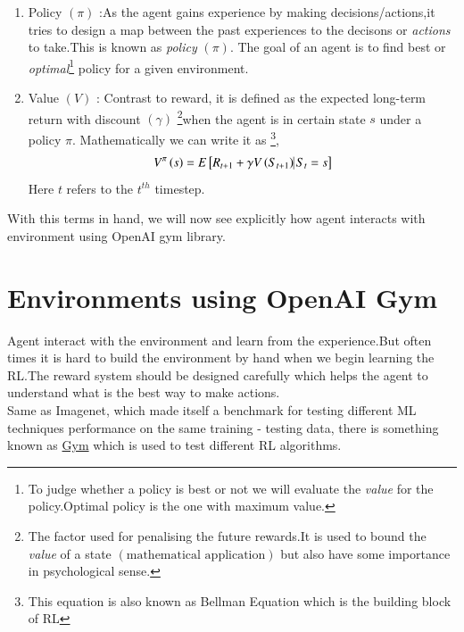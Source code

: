 \documentclass[journal,12pt,onecolumn]{IEEEtran}
\providecommand{\sbrak}[1]{\ensuremath{{}\left[#1\right]}}
\providecommand{\brak}[1]{\ensuremath{\left(#1\right)}}
\theoremstyle{remark}
\numberwithin{equation}{section}
\begin{document}
\begin{enumerate}
\begin{enumerate}
	     \item Policy $\brak{\pi}$ :As the agent gains experience by making decisions/actions,it tries to design a map between the past experiences to the decisons or \textit{actions} to take.This is known as \textit{policy} $\brak{\pi}$. The goal of an agent is to find best or \textit{optimal}\footnote{To judge whether a policy is best or not we will evaluate the \emph{value} for the policy.Optimal policy is the one with maximum value.} policy for a given environment.
	     \item Value $\brak{V}$ : Contrast to reward, it is defined as the expected long-term return with discount $\brak{\gamma}$ \footnote{The factor used for penalising the future rewards.It is used to bound the \textit{value} of a state $\brak{\text{mathematical application}}$ but also have some importance in psychological sense.}when the agent is in certain state $s$ under a policy $\pi$. Mathematically we can write it as \footnote{This equation is also known as Bellman Equation which is the building block of RL},
		      \begin{align}
			      V^{\pi}\brak{s} = E\sbrak{R_{t+1} + \gamma V\brak{S_{t+1}} \vline S_{t} = s}
		      \end{align}
		      Here $t$ refers to the $t^{th}$ timestep.
	  \end{enumerate}
	\end{enumerate}
     With this terms in hand, we will now see explicitly how agent interacts with environment using OpenAI gym library.       
     \section{Environments using OpenAI Gym}
     Agent interact with the environment and learn from the experience.But often times it is hard to build the environment by hand when we begin learning the RL.The
     reward system should be designed carefully which helps the agent to understand what is the best way to make actions. \\ 
     Same as Imagenet, which made itself a benchmark for testing different ML techniques performance on the same training - testing data, there is something known as
     \href{https://www.gymlibrary.dev/}{Gym} which is used to test different RL algorithms. \\
\end{document}
